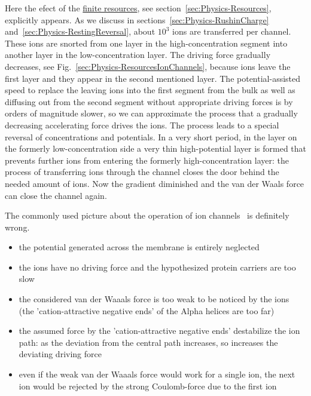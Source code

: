 Here the efect of the \hyperlink{ChangingResources}
{finite resources}, see section~\ref{sec:Physics-Resources}, explicitly appears.
As we discuss in sections~\ref{sec:Physics-RushinCharge}
and~\ref{sec:Physics-RestingReversal}, about $10^3$ ions are transferred
per channel. These ions are snorted from one layer in the 
high-concentration segment into another layer in the low-concentration layer.
The driving force gradually decreases, see Fig.~\ref{sec:Physics-ResourcesIonChannels}, because ions leave the first layer
and they appear in the second mentioned layer.
The potential-assisted speed
to replace the leaving ions into the first segment from the bulk
as well as diffusing out from the second segment without appropriate driving forces is by orders of magnitude slower,
so we can approximate the process that a gradually 
decreasing accelerating force drives the ions.
The process leads to a special reversal of concentrations and potentials.
In a very short period, in the layer on the formerly low-concentration side
a very thin high-potential layer is formed that prevents further ions
from entering the formerly high-concentration layer: the process
of transferring ions through the channel closes the door behind the needed
amount of ions. Now the gradient diminished and the van der Waals force
can close the channel again.

The commonly used picture about the operation of ion channels~\cite{HilleIonChannels:1999} is definitely wrong.
\begin{itemize}
\item the potential generated across the membrane is entirely neglected
\item the ions have no driving force and the hypothesized protein carriers are too slow~\cite{MolecularBiology:2002}
\item the considered van der Waaals force is too weak to be noticed by the ions (the 'cation-attractive negative ends' of the Alpha helices are too far)
\item the assumed force by the 'cation-attractive negative ends' destabilize the ion path: as the deviation from the central path increases, so increases the deviating driving force
\item even if the weak van der Waaals force would work for a single ion,
the next ion would be rejected by the strong Coulomb-force due to the first ion
\end{itemize}



